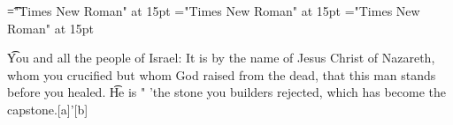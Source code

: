 \documentclass[a4paper]{article}
\begin{document}
 
\pagestyle{plain} 
\sloppy 
\setlength{\parfillskip}{0pt plus 1fil} 
\font\t="Times New Roman" at 15pt
\font\verset="Times New Roman" at 15pt
\font\salvationt="Times New Roman" at 15pt

\pagestyle{fancy} 

\t{You and all the people of Israel: It is by the name of Jesus Christ of Nazareth, whom you crucified but whom God raised from the dead, that this man stands before you healed. }\t{He is " 'the stone you builders rejected, which has become the capstone.[a]'[b] }
\end{document}

